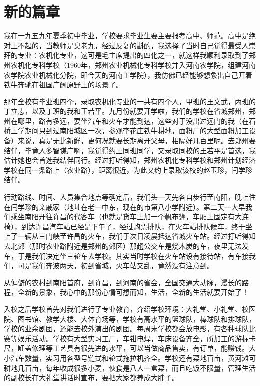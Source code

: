 \chapter{新的篇章}

我在一九五九年夏季初中毕业，学校要求毕业生要主要报考高中、师范。高中是绝对上不起的，当教师是臭老九，经过反复的斟酌，我选择了当时自己觉得最受人崇拜的专业：农机化专业，这可是毛主席提出的四化之一，就这样我顺利录取到了郑州农机化专科学校（1960年，郑州农业机械化专科学校并入河南农学院，组建河南农学院农业机械化分院，即今天的河南工学院），我仿佛已经能够想象出自己开着铁牛奔驰在祖国广阔原野上的场景了。

那年全校有毕业班四个，录取农机化专业的一共有四个人，甲班的王文武，丙班的丁立志，以及丁班的我和王若平。九月份就要开学啦，我们的学校在省城郑州，郑州在哪里，路有多远，要坐汽车和火车才能到达，这些对于没出过远门的我（在石桥上学期间只到过南阳城区一次，参观李花庄铁牛耕地，面粉厂的大型面粉加工设备）来说，真是无比新鲜，更何况就要长期离开父母，相隔好几百里呢。去郑州要结伴，毕竟人多智谋广啊，我觉得约上同班同学，又录取同校的王若平是首选，我估计她也会首选我结伴同行。经过打听得知，郑州农机化专科学校和郑州计划经济学校在同一条路上（农业路），距离很近，为此又约上录取该校的赵玉珍，闫学珍结伴。

行动路线、时间、人员集合地点等确定后，我们头一天先各自步行至南阳，晚上住在闫学珍的亲戚家（地址在老一中东，现在的市第八小学附近）。第二天一大早我们乘坐南阳开往许昌的代客车（也就是货车上加一个帆布篷，车厢上固定有大连椅），到达许昌汽车站已经是下午了，经过购票排队，在火车站排队候车，终于坐上了一辆从三门峡至许昌的火车，我们于次日凌晨抵达省城火车站。经过打听得知去北郊（那时农业路附近是郑州的郊区）那趟公交车是烧木炭的车，夜里无法发车，于是我们决定坐三轮车去学校。其实当时学校在火车站设有接待站，有车接我们，可是我们奔波两天，初到省城，火车站又乱，竟然没有注意到。

从偏僻的农村到南阳首府，到许昌，到河南的省会，全国交通大动脉，漫长的路程，全新的景象，我心中的那份心情可想而知，生活，全新的生活就要开始了！

入校之后学校首先对我们进行了专业教育，介绍学校环境：大礼堂、小礼堂、校医院、图书馆、教学大楼、大体育场等，学校有高水平的篮球队，棒球队和排球队，学校的业余剧团，还能去校外演出的剧团。每周末学校都会放电影，有各种球队比赛等娱乐活动。学校有大型实习工厂，车钳电焊，车床设备齐全，所加工的游标卡尺，缸盖修理等工艺具有很先进的水平，可以当做商品售卖，有订单，能赚钱。大小汽车数量，实习用各型号链式和轮式拖拉机齐全。学校还有菜地百亩，黄河滩可耕地几百亩，每年收成很多小麦，伙食是八人一盒菜，而且吃饭不限量，管理生活的副校长在大礼堂讲话时宣布，要把大家都养成大胖子。

